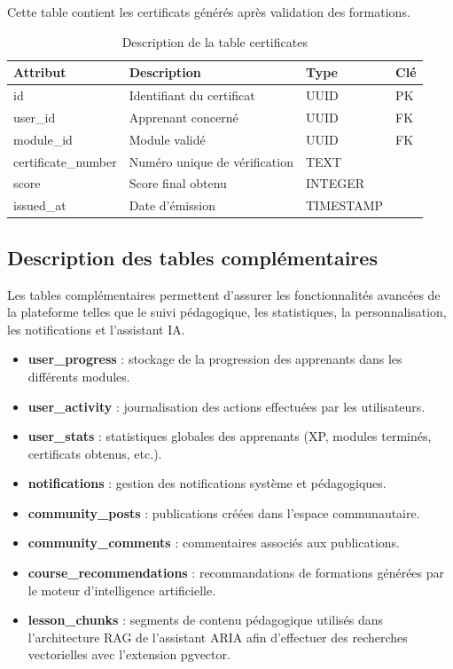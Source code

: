 \documentclass[12pt, a4paper]{report}
\begin{document}
Cette table contient les certificats générés après validation des formations.

\begin{table}[H]
\centering
\caption{Description de la table certificates}
\begin{tabularx}{\textwidth}{|p{3cm}|X|p{2.5cm}|p{1.5cm}|}
\hline
Attribut & Description & Type & Clé \\
\hline
id & Identifiant du certificat & UUID & PK \\
user\_id & Apprenant concerné & UUID & FK \\
module\_id & Module validé & UUID & FK \\
certificate\_number & Numéro unique de vérification & TEXT & \\
score & Score final obtenu & INTEGER & \\
issued\_at & Date d'émission & TIMESTAMP & \\
\hline
\end{tabularx}
\end{table}

\subsection{Description des tables complémentaires}

Les tables complémentaires permettent d'assurer les fonctionnalités avancées de
la plateforme telles que le suivi pédagogique, les statistiques, la
personnalisation, les notifications et l'assistant IA.

\begin{itemize}

\item \textbf{user\_progress} : stockage de la progression des apprenants dans
les différents modules.

\item \textbf{user\_activity} : journalisation des actions effectuées par les
utilisateurs.

\item \textbf{user\_stats} : statistiques globales des apprenants (XP, modules
terminés, certificats obtenus, etc.).

\item \textbf{notifications} : gestion des notifications système et
pédagogiques.

\item \textbf{community\_posts} : publications créées dans l'espace
communautaire.

\item \textbf{community\_comments} : commentaires associés aux publications.

\item \textbf{course\_recommendations} : recommandations de formations générées
par le moteur d'intelligence artificielle.

\item \textbf{lesson\_chunks} : segments de contenu pédagogique utilisés dans
l'architecture RAG de l'assistant ARIA afin d'effectuer des recherches
vectorielles avec l'extension pgvector.

\end{itemize}
\end{document}
